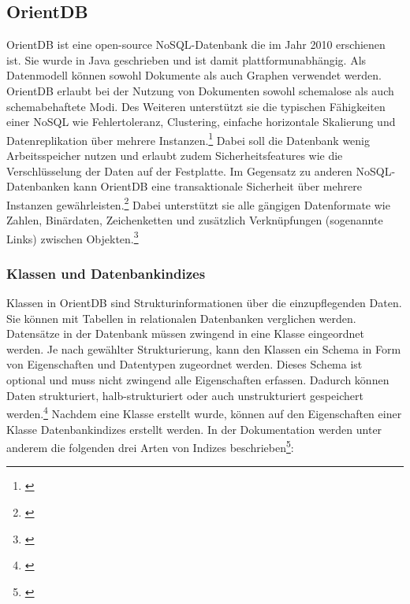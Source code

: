 
\subsection{OrientDB}


OrientDB ist eine open-source NoSQL-Datenbank die im Jahr 2010 erschienen ist. Sie wurde in Java geschrieben und ist damit plattformunabhängig. Als Datenmodell können sowohl Dokumente als auch Graphen verwendet werden. OrientDB erlaubt bei der Nutzung von Dokumenten sowohl schemalose als auch schemabehaftete Modi. Des Weiteren unterstützt sie die typischen Fähigkeiten einer NoSQL wie Fehlertoleranz, Clustering, einfache horizontale Skalierung und Datenreplikation über mehrere Instanzen.\footnote{\cite[Vgl.][]{OrientDBGettingStarted}} Dabei soll die Datenbank wenig Arbeitsspeicher nutzen und erlaubt zudem Sicherheitsfeatures wie die Verschlüsselung der Daten auf der Festplatte. Im Gegensatz zu anderen NoSQL-Datenbanken kann OrientDB eine transaktionale Sicherheit über mehrere Instanzen gewährleisten.\footnote{\cite[Vgl.][]{OrientDBTransactions}} Dabei unterstützt sie alle gängigen Datenformate wie Zahlen, Binärdaten, Zeichenketten und zusätzlich Verknüpfungen (sogenannte Links) zwischen Objekten.\footnote{\cite[Vgl.][]{OrientDBTypes}}

\subsubsection{Klassen und Datenbankindizes}

Klassen in OrientDB sind Strukturinformationen über die einzupflegenden Daten. Sie können mit Tabellen in relationalen Datenbanken verglichen werden. Datensätze in der Datenbank müssen zwingend in eine Klasse eingeordnet werden. Je nach gewählter Strukturierung, kann den Klassen ein Schema in Form von Eigenschaften und Datentypen zugeordnet werden. Dieses Schema ist optional und muss nicht zwingend alle Eigenschaften erfassen. Dadurch können Daten strukturiert, halb-strukturiert oder auch unstrukturiert gespeichert werden.\footnote{\cite[Vgl.][]{OrientDBClasses}} Nachdem eine Klasse erstellt wurde, können auf den Eigenschaften einer Klasse Datenbankindizes erstellt werden. In der Dokumentation werden unter anderem die folgenden drei Arten von Indizes beschrieben\footnote{\cite[Vgl.][]{OrientDBIndexes}}:

